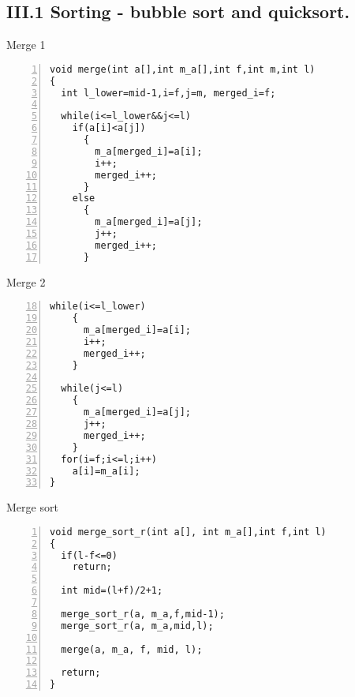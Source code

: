 \documentclass{beamer}
\begin{document}
\subsection*{III.1 Sorting - bubble sort and quicksort.}
\begin{frame}[fragile]{Merge 1}
\begin{lstlisting}[numbers=left]
void merge(int a[],int m_a[],int f,int m,int l)
{
  int l_lower=mid-1,i=f,j=m, merged_i=f;

  while(i<=l_lower&&j<=l)
    if(a[i]<a[j])
      {
        m_a[merged_i]=a[i];
        i++;
        merged_i++;
      }
    else
      {
        m_a[merged_i]=a[j];
        j++;
        merged_i++;
      }
\end{lstlisting}
\end{frame}
\begin{frame}[fragile]{Merge 2}
\begin{lstlisting}[numbers=left,firstnumber=18]
  while(i<=l_lower)
    {
      m_a[merged_i]=a[i];
      i++;
      merged_i++;
    }

  while(j<=l)
    {
      m_a[merged_i]=a[j];
      j++;
      merged_i++;
    }
  for(i=f;i<=l;i++)
    a[i]=m_a[i];
}
\end{lstlisting}
\end{frame}

\begin{frame}[fragile]{Merge sort}
\begin{lstlisting}[numbers=left]
void merge_sort_r(int a[], int m_a[],int f,int l)
{
  if(l-f<=0)
    return;

  int mid=(l+f)/2+1;

  merge_sort_r(a, m_a,f,mid-1);
  merge_sort_r(a, m_a,mid,l);

  merge(a, m_a, f, mid, l);

  return;
}
\end{lstlisting}
\end{frame}
\end{document}
